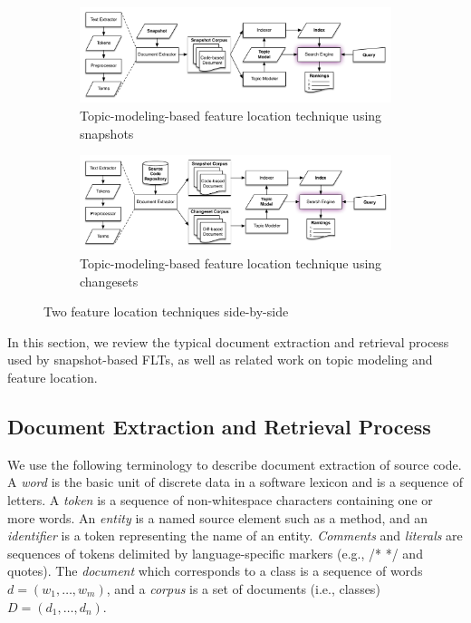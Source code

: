 
\begin{figure}[t]
    \centering
\begin{subfigure}[t]{.9\textwidth}
    \centerline{\includegraphics[width=\textwidth]{figures/snapshot-flt}}
    \caption{Topic-modeling-based feature location technique using snapshots}
    \label{fig:snapshot}
\end{subfigure}

\begin{subfigure}[b]{.9\textwidth}
    \centerline{\includegraphics[width=\textwidth]{figures/changeset-flt}}
\caption{Topic-modeling-based feature location technique using changesets}
\label{fig:changeset}
\end{subfigure}

\label{fig:flts}
\caption{Two feature location techniques side-by-side}
\end{figure}


In this section, we review the typical document extraction and retrieval process used by snapshot-based FLTs,
as well as related work on topic modeling and feature location.

\subsection{Document Extraction and Retrieval Process}
\label{sec:snapshot-flt}

We use the following terminology to describe document extraction of source code.
A \textit{word} is the basic unit of discrete data in a software lexicon and is a sequence of letters.
A \textit{token} is a sequence of non-whitespace characters containing one or more words.
An \textit{entity} is a named source element such as a method,
and an \textit{identifier} is a token representing the name of an entity.
\textit{Comments} and \textit{literals} are sequences of tokens delimited by language-specific markers (e.g., /* */ and quotes).
The \textit{document} which corresponds to a class is a sequence of words $d = (w_1, \ldots, w_m)$,
and a \textit{corpus} is a set of documents (i.e., classes) $D = (d_1, \ldots, d_n)$.

